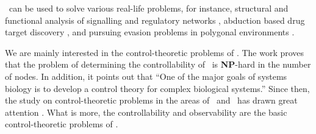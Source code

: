
\BCNs\ can be used to solve various real-life problems, for instance, %
structural and functional analysis of signalling and regulatory networks \cite{Kaufman1999A, Klamt2006A}, 
abduction based drug target discovery \cite{Biane2017Abduction}, %
and pursuing evasion problems in polygonal environments \cite{Thunberg2011A}. 





      

We are mainly interested in the control-theoretic problems of \BCNs. The work \cite{Akutsu2007Control} proves that the problem of determining the controllability of \BCNs\ is {\bf NP}-hard in the number of nodes. In addition, it points out that ``One of the major goals of systems biology is to develop a control theory for complex biological systems.'' Since then, the study on control-theoretic problems in the areas of \BNs\ and \BCNs\ has drawn great attention \cite{cheng2009controllability, Zhao2010Input, Cheng2011Identification, Cheng2011Analysis,Fornasini2013Observability}. What is more, the controllability and observability are the basic control-theoretic problems of \BCNs. %

